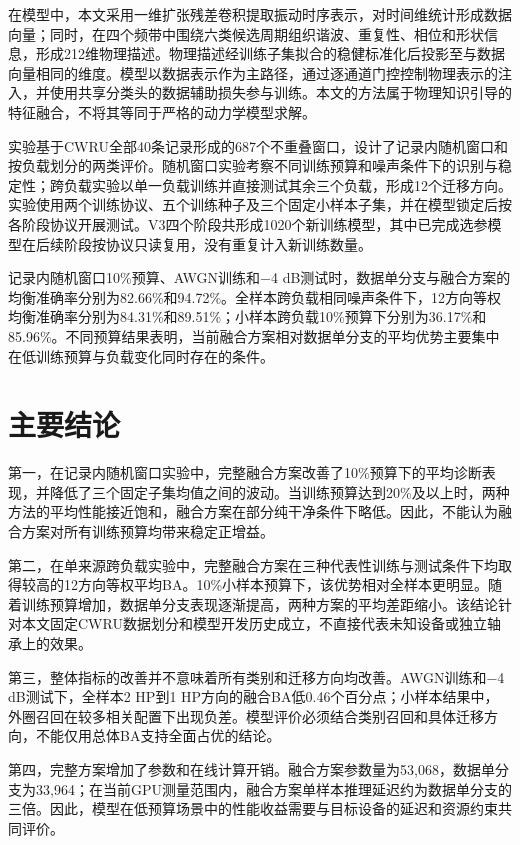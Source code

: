 \documentclass[UTF8,12pt,openany,twoside]{ctexbook}
\numberwithin{equation}{chapter}
\begin{document}
在模型中，本文采用一维扩张残差卷积提取振动时序表示，对时间维统计形成数据向量；同时，在四个频带中围绕六类候选周期组织谐波、重复性、相位和形状信息，形成212维物理描述。物理描述经训练子集拟合的稳健标准化后投影至与数据向量相同的维度。模型以数据表示作为主路径，通过逐通道门控控制物理表示的注入，并使用共享分类头的数据辅助损失参与训练。本文的方法属于物理知识引导的特征融合，不将其等同于严格的动力学模型求解。

实验基于CWRU全部40条记录形成的687个不重叠窗口，设计了记录内随机窗口和按负载划分的两类评价。随机窗口实验考察不同训练预算和噪声条件下的识别与稳定性；跨负载实验以单一负载训练并直接测试其余三个负载，形成12个迁移方向。实验使用两个训练协议、五个训练种子及三个固定小样本子集，并在模型锁定后按各阶段协议开展测试。V3四个阶段共形成1020个新训练模型，其中已完成选参模型在后续阶段按协议只读复用，没有重复计入新训练数量。

记录内随机窗口10\%预算、AWGN训练和−4 dB测试时，数据单分支与融合方案的均衡准确率分别为82.66\%和94.72\%。全样本跨负载相同噪声条件下，12方向等权均衡准确率分别为84.31\%和89.51\%；小样本跨负载10\%预算下分别为36.17\%和85.96\%。不同预算结果表明，当前融合方案相对数据单分支的平均优势主要集中在低训练预算与负载变化同时存在的条件。

\section{主要结论}\label{ux4e3bux8981ux7ed3ux8bba}

第一，在记录内随机窗口实验中，完整融合方案改善了10\%预算下的平均诊断表现，并降低了三个固定子集均值之间的波动。当训练预算达到20\%及以上时，两种方法的平均性能接近饱和，融合方案在部分纯干净条件下略低。因此，不能认为融合方案对所有训练预算均带来稳定正增益。

第二，在单来源跨负载实验中，完整融合方案在三种代表性训练与测试条件下均取得较高的12方向等权平均BA。10\%小样本预算下，该优势相对全样本更明显。随着训练预算增加，数据单分支表现逐渐提高，两种方案的平均差距缩小。该结论针对本文固定CWRU数据划分和模型开发历史成立，不直接代表未知设备或独立轴承上的效果。

第三，整体指标的改善并不意味着所有类别和迁移方向均改善。AWGN训练和−4 dB测试下，全样本2 HP到1 HP方向的融合BA低0.46个百分点；小样本结果中，外圈召回在较多相关配置下出现负差。模型评价必须结合类别召回和具体迁移方向，不能仅用总体BA支持全面占优的结论。

第四，完整方案增加了参数和在线计算开销。融合方案参数量为53,068，数据单分支为33,964；在当前GPU测量范围内，融合方案单样本推理延迟约为数据单分支的三倍。因此，模型在低预算场景中的性能收益需要与目标设备的延迟和资源约束共同评价。
\end{document}
